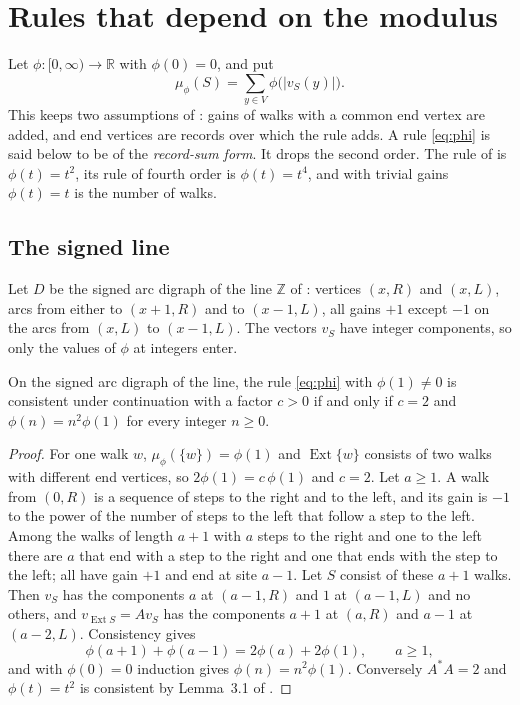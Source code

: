 \section{Rules that depend on the modulus}\label{sec:mod}

Let $\phi\colon[0,\infty)\to\mathbb{R}$ with $\phi(0)=0$, and put
\begin{equation}\label{eq:phi}
\mu_\phi(S)=\sum_{y\in V}\phi\bigl(|v_S(y)|\bigr).
\end{equation}
This keeps two assumptions of \cite{g8}: gains of walks with a common end vertex are added, and end vertices are records over which the rule adds. A rule \eqref{eq:phi} is said below to be of the \emph{record-sum form}. It drops the second order. The rule of \cite{g8} is $\phi(t)=t^2$, its rule of fourth order is $\phi(t)=t^4$, and with trivial gains $\phi(t)=t$ is the number of walks.

\subsection{The signed line}
Let $D$ be the signed arc digraph of the line $\mathbb{Z}$ of \cite{g9}: vertices $(x,R)$ and $(x,L)$, arcs from either to $(x+1,R)$ and to $(x-1,L)$, all gains $+1$ except $-1$ on the arcs from $(x,L)$ to $(x-1,L)$. The vectors $v_S$ have integer components, so only the values of $\phi$ at integers enter.

\begin{theorem}\label{thm:quad}
On the signed arc digraph of the line, the rule \eqref{eq:phi} with $\phi(1)\ne0$ is consistent under continuation with a factor $c>0$ if and only if $c=2$ and $\phi(n)=n^2\phi(1)$ for every integer $n\ge0$.
\end{theorem}
\begin{proof}
For one walk $w$, $\mu_\phi(\{w\})=\phi(1)$ and $\operatorname{Ext}\{w\}$ consists of two walks with different end vertices, so $2\phi(1)=c\,\phi(1)$ and $c=2$. Let $a\ge1$. A walk from $(0,R)$ is a sequence of steps to the right and to the left, and its gain is $-1$ to the power of the number of steps to the left that follow a step to the left. Among the walks of length $a+1$ with $a$ steps to the right and one to the left there are $a$ that end with a step to the right and one that ends with the step to the left; all have gain $+1$ and end at site $a-1$. Let $S$ consist of these $a+1$ walks. Then $v_S$ has the components $a$ at $(a-1,R)$ and $1$ at $(a-1,L)$ and no others, and $v_{\operatorname{Ext}S}=Av_S$ has the components $a+1$ at $(a,R)$ and $a-1$ at $(a-2,L)$. Consistency gives
\[
\phi(a+1)+\phi(a-1)=2\phi(a)+2\phi(1),\qquad a\ge1 ,
\]
and with $\phi(0)=0$ induction gives $\phi(n)=n^2\phi(1)$. Conversely $A^*A=2$ and $\phi(t)=t^2$ is consistent by Lemma~3.1 of \cite{g9}.
\end{proof}

